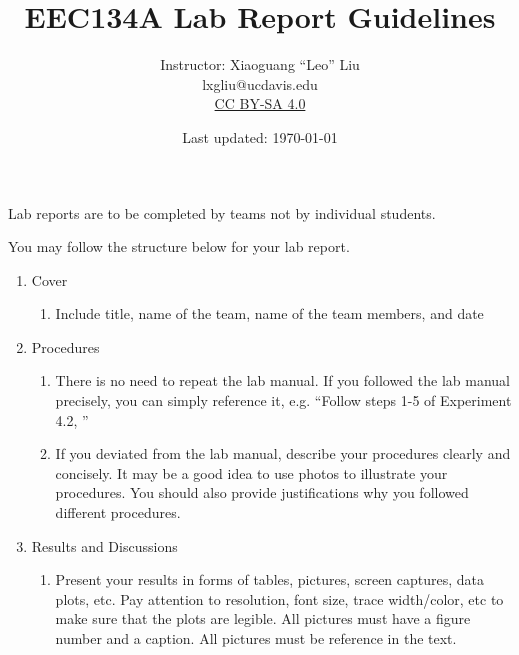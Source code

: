 \documentclass[letterpaper, 11pt]{article}
\title{EEC134A Lab Report Guidelines}
\author{Instructor: Xiaoguang ``Leo'' Liu \\ lxgliu@ucdavis.edu \\ \small \href{http://creativecommons.org/licenses/by-sa/4.0/}{CC BY-SA 4.0}}
\date{Last updated: \today}
\begin{document}
\maketitle

Lab reports are to be completed by teams not by individual students. 

You may follow the structure below for your lab report. 

\begin{enumerate}
	\item Cover
		\begin{enumerate}
			\item Include title, name of the team, name of the team members, and date 
		\end{enumerate}
	\item Procedures
		\begin{enumerate}
			\item There is no need to repeat the lab manual. If you followed the lab manual precisely, you can simply reference it, e.g. ``Follow steps 1-5 of Experiment 4.2, \cdots ''
			
			\item If you deviated from the lab manual, describe your procedures clearly and concisely. It may be a good idea to use photos to illustrate your procedures. You should also provide justifications why you followed different procedures. 
		\end{enumerate}
	\item Results and Discussions
		\begin{enumerate}
			\item Present your results in forms of tables, pictures, screen captures, data plots, etc. Pay attention to resolution, font size, trace width/color, etc to make sure that the plots are legible. All pictures must have a figure number and a caption. All pictures must be reference in the text.
			

\end{enumerate}
\end{enumerate}
\end{document}
